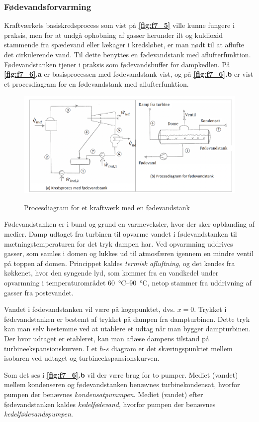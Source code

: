 \subsubsection{Fødevandsforvarming}
Kraftværkets basiskredsprocess som vist på \textbf{\autoref{fig:f7_5}} ville kunne fungere i praksis, men for at undgå ophobning af gasser herunder ilt og kuldioxid stammende fra spædevand eller lækager i kredsløbet, er man nødt til at aflufte det cirkulerende vand. Til dette benyttes en fødevandstank med aflufterfunktion. Fødevandstanken tjener i praksis som fødevandsbuffer for dampkedlen. På \textbf{\autoref{fig:f7_6}.a} er basisprocessen med fødevandstank vist, og på \textbf{\autoref{fig:f7_6}.b} er vist et procesdiagram for en fødevandstank med aflufterfunktion. 
\begin{figure} [ht]
  \centering
  \caption{Procesdiagram for et kraftværk med en fødevandstank}
  \includegraphics[width=0.5\linewidth]{./figures/f7_6.png}
  \label{fig:f7_6}
\end{figure}

Fødevandstanken er i bund og grund en varmeveksler, hvor der sker opblanding af medier. Damp udtaget fra turbinen til opvarme vandet i fødevandstanken til mætningstemperaturen for det tryk dampen har. Ved opvarmning uddrives gasser, som samles i domen og lukkes ud til atmosfæren igennem en mindre ventil på toppen af domen. Princippet kaldes \textit{termisk afluftning}, og det kendes fra køkkenet, hvor den syngende lyd, som kommer fra en vandkedel under opvarmning i temperaturområdet \qty{60}{\celsius}--\qty{90}{\celsius}, netop stammer fra uddrivning af gasser fra postevandet.

Vandet i fødevandstanken vil være på kogepunktet, dvs. $x=0$. Trykket i fødevandstanken er bestemt af trykket på dampen fra dampturbinen. Dette tryk kan man selv bestemme ved at utablere et udtag når man bygger dampturbinen. Der hvor udtaget er etableret, kan man aflæse dampens tilstand på turbineekspansionskurven. I et $h$-$s$ diagram er det skæringspunktet mellem isobaren ved udtaget og turbineekspansionskurven.

Som det ses i \textbf{\autoref{fig:f7_6}.b} vil der være brug for to pumper. Mediet (vandet) mellem kondenseren og fødevandstanken benævnes turbinekondensat, hvorfor pumpen der benævnes \textit{kondensatpummpen}. Mediet (vandet) efter fødevandstanken kaldes \textit{kedelfødevand}, hvorfor pumpen der benævnes \textit{kedelfødevandspumpen}. 

